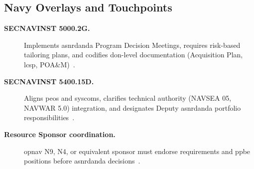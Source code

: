 \documentclass[../main.tex]{subfiles}
\begin{document}
\subsection{Navy Overlays and Touchpoints}
\begin{description}
	\item[\textbf{SECNAVINST 5000.2G.}] Implements \ac{asnrdanda} Program Decision Meetings, requires risk-based tailoring plans, and codifies \ac{don}-level documentation (Acquisition Plan, \ac{lcsp}, POA\&M)~\autocite{SECNAV5000-2G}.
	\item[\textbf{SECNAVINST 5400.15D.}] Aligns \acp{peo} and \acp{syscom}, clarifies technical authority (NAVSEA 05, NAVWAR 5.0) integration, and designates Deputy \ac{asnrdanda} portfolio responsibilities~\autocite{SECNAV5400-15D}.
	\item[\textbf{Resource Sponsor coordination.}] \ac{opnav} N9, N4, or equivalent sponsor must endorse requirements and \ac{ppbe} positions before \ac{asnrdanda} decisions~\autocite{edo-3-3-1-acq-policy-players-2025}.
\end{description}

\end{document}
